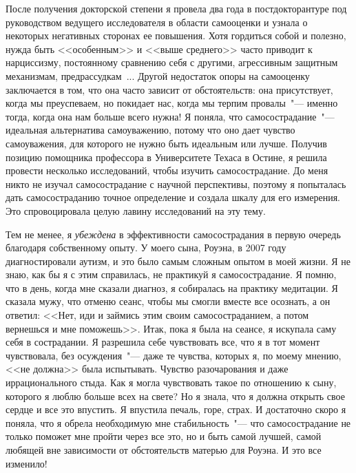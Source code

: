 	После получения докторской степени я провела два года в постдокторантуре под руководством ведущего исследователя в области самооценки и узнала о некоторых негативных сторонах ее повышения. Хотя гордиться собой и полезно, нужда быть <<особенным>> и <<выше среднего>> часто приводит к нарциссизму, постоянному сравнению себя с другими, агрессивным защитным механизмам, предрассудкам~\cite{17}... Другой недостаток опоры на самооценку заключается в том, что она часто зависит от обстоятельств: она присутствует, когда мы преуспеваем, но покидает нас, когда мы терпим провалы~"--- именно тогда, когда она нам больше всего нужна! Я поняла, что самосострадание~"--- идеальная альтернатива самоуважению, потому что оно дает чувство самоуважения, для которого не нужно быть идеальным или лучше. Получив позицию помощника профессора в Университете Техаса в Остине, я решила провести несколько исследований, чтобы изучить самосострадание. До меня никто не изучал самосострадание с научной перспективы, поэтому я попыталась дать самосостраданию точное определение и создала шкалу для его измерения. Это спровоцировала целую лавину исследований на эту тему.  
	
	Тем не менее, я \emph{убеждена} в эффективности самосострадания в первую очередь благодаря собственному опыту. У моего сына, Роуэна, в 2007 году диагностировали аутизм, и это было самым сложным опытом в моей жизни. Я не знаю, как бы я с этим справилась, не практикуй я самосострадание. Я помню, что в день, когда мне сказали диагноз, я собиралась на практику медитации. Я сказала мужу, что отменю сеанс, чтобы мы смогли вместе все осознать, а он ответил: <<Нет, иди и займись этим своим самосостраданием, а потом вернешься и мне поможешь>>. Итак, пока я была на сеансе, я искупала саму себя в сострадании. Я разрешила себе чувствовать все, что я в тот момент чувствовала, без осуждения~"--- даже те чувства, которых я, по моему мнению, <<не должна>> была испытывать. Чувство разочарования и даже иррационального стыда. Как я могла чувствовать такое по отношению к сыну, которого я люблю больше всех на свете? Но я знала, что я должна открыть свое сердце и все это впустить. Я впустила печаль, горе, страх. И достаточно скоро я поняла, что я обрела необходимую мне стабильность~"--- что самосострадание не только поможет мне пройти через все это, но и быть самой лучшей, самой любящей вне зависимости от обстоятельств матерью для Роуэна. И это все изменило!
	
